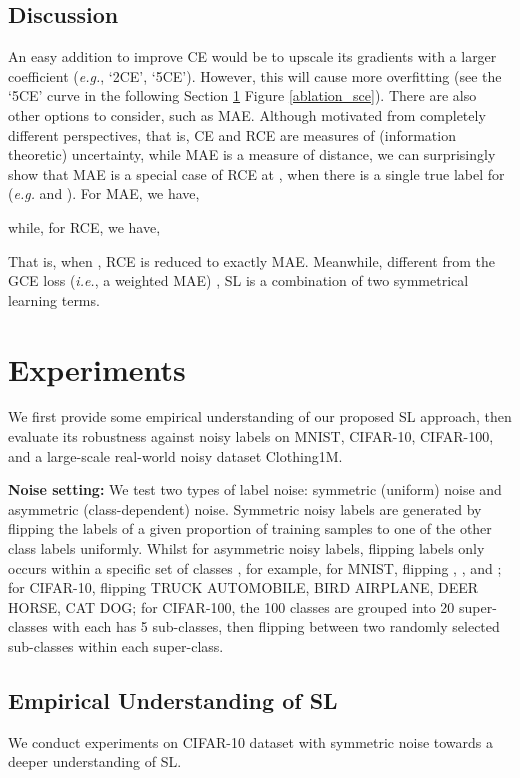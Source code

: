 \documentclass[10pt,twocolumn,letterpaper]{article}
\begin{document}
\subsection{Discussion}\label{sec:discuss}
An easy addition to improve CE would be to upscale its gradients with a larger coefficient (\textit{e.g.}, `2CE', `5CE'). However, this will cause more overfitting (see the `5CE' curve in the following Section \ref{sec:experiments} Figure \ref{ablation_sce}). There are also other options to consider, such as MAE. Although motivated from completely different perspectives, that is, CE and RCE are measures of (information theoretic) uncertainty, while MAE is a measure of distance, we can surprisingly show that MAE is a special case of RCE at , when there is a single true label for  (\textit{e.g.}  and ). For MAE, we have,

while, for RCE, we have,

That is, when , RCE is reduced to exactly MAE. Meanwhile, different from the GCE loss (\textit{i.e.}, a weighted MAE) \cite{zhang2018generalized},  SL is a combination of two symmetrical learning terms. 

\section{Experiments}\label{sec:experiments}
We first provide some empirical understanding of our proposed SL approach, then evaluate its robustness against noisy labels on MNIST, CIFAR-10, CIFAR-100, and a large-scale real-world noisy dataset Clothing1M.

\noindent\textbf{Noise setting:} 
We test two types of label noise: symmetric (uniform) noise and asymmetric (class-dependent) noise. Symmetric noisy labels are generated by flipping the labels of a given proportion of training samples to one of the other class labels uniformly. Whilst for asymmetric noisy labels, flipping labels only occurs within a specific set of classes \cite{patrini2017making, zhang2018generalized}, for example, for MNIST, flipping , ,  and ; for CIFAR-10, flipping TRUCK  AUTOMOBILE, BIRD  AIRPLANE, DEER  HORSE, CAT  DOG; for CIFAR-100, the 100 classes are grouped into 20 super-classes with each has 5 sub-classes, then flipping between two randomly selected sub-classes within each super-class.

\subsection{Empirical Understanding of SL}\label{understanding_sce}
We conduct experiments on CIFAR-10 dataset with symmetric noise towards a deeper understanding of SL. 
\end{document}
